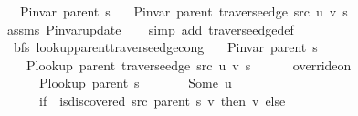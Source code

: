 \begin{isabellebody}
\ \ \ {\isachardoublequoteopen}P{\isacharunderscore}{\kern0pt}invar\ {\isacharparenleft}{\kern0pt}parent\ s{\isacharparenright}{\kern0pt}{\isachardoublequoteclose}\isanewline
\ \ \ {\isachardoublequoteopen}P{\isacharunderscore}{\kern0pt}invar\ {\isacharparenleft}{\kern0pt}parent\ {\isacharparenleft}{\kern0pt}traverse{\isacharunderscore}{\kern0pt}edge\ src\ u\ v\ s{\isacharparenright}{\kern0pt}{\isacharparenright}{\kern0pt}{\isachardoublequoteclose}\isanewline
%
\isadelimproof
\ \ %
\endisadelimproof
%
\isatagproof
{}\isamarkupfalse%
\ assms\ P{\isachardot}{\kern0pt}invar{\isacharunderscore}{\kern0pt}update\isanewline
\ \ \isamarkupfalse%
\ {\isacharparenleft}{\kern0pt}simp\ add{\isacharcolon}{\kern0pt}\ traverse{\isacharunderscore}{\kern0pt}edge{\isacharunderscore}{\kern0pt}def{\isacharparenright}{\kern0pt}%
\endisatagproof
{\isafoldproof}%
%
\isadelimproof
\isanewline
%
\endisadelimproof
\isanewline
{}\isamarkupfalse%
\ {\isacharparenleft}{\kern0pt}\ bfs{\isacharparenright}{\kern0pt}\ lookup{\isacharunderscore}{\kern0pt}parent{\isacharunderscore}{\kern0pt}traverse{\isacharunderscore}{\kern0pt}edge{\isacharunderscore}{\kern0pt}cong{\isacharcolon}{\kern0pt}\isanewline
\ \ \ {\isachardoublequoteopen}P{\isacharunderscore}{\kern0pt}invar\ {\isacharparenleft}{\kern0pt}parent\ s{\isacharparenright}{\kern0pt}{\isachardoublequoteclose}\isanewline
\ \ \isanewline
\ \ \ \ {\isachardoublequoteopen}P{\isacharunderscore}{\kern0pt}lookup\ {\isacharparenleft}{\kern0pt}parent\ {\isacharparenleft}{\kern0pt}traverse{\isacharunderscore}{\kern0pt}edge\ src\ u\ v\ s{\isacharparenright}{\kern0pt}{\isacharparenright}{\kern0pt}\ {\isacharequal}{\kern0pt}\isanewline
\ \ \ \ \ override{\isacharunderscore}{\kern0pt}on\isanewline
\ \ \ \ \ \ {\isacharparenleft}{\kern0pt}P{\isacharunderscore}{\kern0pt}lookup\ {\isacharparenleft}{\kern0pt}parent\ s{\isacharparenright}{\kern0pt}{\isacharparenright}{\kern0pt}\isanewline
\ \ \ \ \ \ {\isacharparenleft}{\kern0pt}{\isasymlambda}{\isacharunderscore}{\kern0pt}{\isachardot}{\kern0pt}\ Some\ u{\isacharparenright}{\kern0pt}\isanewline
\ \ \ \ \ \ {\isacharparenleft}{\kern0pt}if\ {\isasymnot}\ is{\isacharunderscore}{\kern0pt}discovered\ src\ {\isacharparenleft}{\kern0pt}parent\ s{\isacharparenright}{\kern0pt}\ v\ then\ {\isacharbraceleft}{\kern0pt}v{\isacharbraceright}{\kern0pt}\ else\ {\isacharbraceleft}{\kern0pt}{\isacharbraceright}{\kern0pt}{\isacharparenright}{\kern0pt}{\isachardoublequoteclose}\isanewline

\end{isabellebody}
